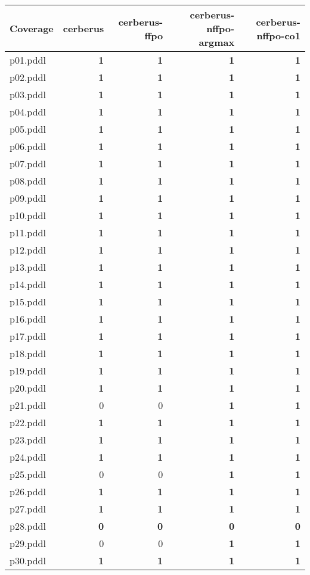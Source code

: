 \documentclass{article}
\begin{document}
\begin{tabular}{@{}lrrrr@{}}
Coverage & cerberus & cerberus-ffpo & cerberus-nffpo-argmax & cerberus-nffpo-co1 \\
\midrule
p01.pddl & \textbf{1} & \textbf{1} & \textbf{1} & \textbf{1} \\
p02.pddl & \textbf{1} & \textbf{1} & \textbf{1} & \textbf{1} \\
p03.pddl & \textbf{1} & \textbf{1} & \textbf{1} & \textbf{1} \\
p04.pddl & \textbf{1} & \textbf{1} & \textbf{1} & \textbf{1} \\
p05.pddl & \textbf{1} & \textbf{1} & \textbf{1} & \textbf{1} \\
p06.pddl & \textbf{1} & \textbf{1} & \textbf{1} & \textbf{1} \\
p07.pddl & \textbf{1} & \textbf{1} & \textbf{1} & \textbf{1} \\
p08.pddl & \textbf{1} & \textbf{1} & \textbf{1} & \textbf{1} \\
p09.pddl & \textbf{1} & \textbf{1} & \textbf{1} & \textbf{1} \\
p10.pddl & \textbf{1} & \textbf{1} & \textbf{1} & \textbf{1} \\
p11.pddl & \textbf{1} & \textbf{1} & \textbf{1} & \textbf{1} \\
p12.pddl & \textbf{1} & \textbf{1} & \textbf{1} & \textbf{1} \\
p13.pddl & \textbf{1} & \textbf{1} & \textbf{1} & \textbf{1} \\
p14.pddl & \textbf{1} & \textbf{1} & \textbf{1} & \textbf{1} \\
p15.pddl & \textbf{1} & \textbf{1} & \textbf{1} & \textbf{1} \\
p16.pddl & \textbf{1} & \textbf{1} & \textbf{1} & \textbf{1} \\
p17.pddl & \textbf{1} & \textbf{1} & \textbf{1} & \textbf{1} \\
p18.pddl & \textbf{1} & \textbf{1} & \textbf{1} & \textbf{1} \\
p19.pddl & \textbf{1} & \textbf{1} & \textbf{1} & \textbf{1} \\
p20.pddl & \textbf{1} & \textbf{1} & \textbf{1} & \textbf{1} \\
p21.pddl & 0 & 0 & \textbf{1} & \textbf{1} \\
p22.pddl & \textbf{1} & \textbf{1} & \textbf{1} & \textbf{1} \\
p23.pddl & \textbf{1} & \textbf{1} & \textbf{1} & \textbf{1} \\
p24.pddl & \textbf{1} & \textbf{1} & \textbf{1} & \textbf{1} \\
p25.pddl & 0 & 0 & \textbf{1} & \textbf{1} \\
p26.pddl & \textbf{1} & \textbf{1} & \textbf{1} & \textbf{1} \\
p27.pddl & \textbf{1} & \textbf{1} & \textbf{1} & \textbf{1} \\
p28.pddl & \textbf{0} & \textbf{0} & \textbf{0} & \textbf{0} \\
p29.pddl & 0 & 0 & \textbf{1} & \textbf{1} \\
p30.pddl & \textbf{1} & \textbf{1} & \textbf{1} & \textbf{1} \\
\end{tabular}
\end{document}
